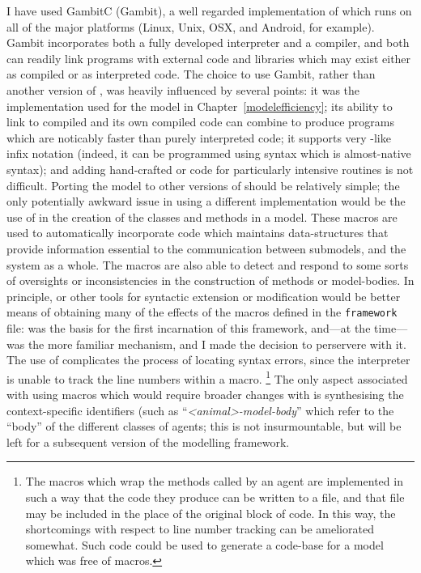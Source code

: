 I have used \textsf{GambitC} (\textsf{Gambit}), a well regarded
implementation of \Scheme which runs on all of the major platforms
(Linux, Unix, OSX, and Android, for example). \textsf{Gambit}
incorporates both a fully developed \Scheme interpreter and a
compiler, and both can readily link programs with external code and
libraries which may exist either as compiled or as interpreted \Scheme
code. The choice to use \textsf{Gambit}, rather than another version
of \Scheme, was heavily influenced by several points: it was the
implementation used for the model in Chapter~\ref{modelefficiency};
its ability to link to compiled \CC and its own compiled code can
combine to produce programs which are noticably faster than purely
interpreted code; it supports very \CC-like infix notation (indeed, it
can be programmed using syntax which is almost-native \CC syntax); and
adding hand-crafted \Cc or \Cpp code for particularly intensive
routines is not difficult.  Porting the model to other versions of
\Scheme should be relatively simple; the only potentially awkward
issue in using a different \Scheme implementation would be the use of
\sdefmac in the creation of the classes and methods in a model.  These
macros are used to automatically incorporate code which maintains
data-structures that provide information essential to the
communication between submodels, and the system as a whole. The macros
are also able to detect and respond to some sorts of oversights or
inconsistencies in the construction of methods or model-bodies.  In
principle, \sdefsyntax or other tools for syntactic extension or
modification would be better means of obtaining many of the effects of
the macros defined in the \texttt{framework} file: \sdefmac was the
basis for the first incarnation of this framework, and---at the
time---was the more familiar mechanism, and I made the decision to
perservere with it. The use of \sdefmac complicates the process of
locating syntax errors, since the interpreter is unable to track the
line numbers within a macro. \footnote{The macros which wrap the
  methods called by an agent are implemented in such a way that the
  code they produce can be written to a file, and that file may be
  included in the place of the original block of code.  In this way,
  the shortcomings with respect to line number tracking can be
  ameliorated somewhat.  Such code could be used to generate a
  code-base for a model which was free of macros.}  The only aspect
associated with using macros which would require broader changes with
\sdefsyntax is synthesising the context-specific identifiers (such as
``\textit{<animal>-model-body}'' which refer to the ``body'' of the
different classes of agents; this is not insurmountable, but will be
left for a subsequent version of the modelling framework.


